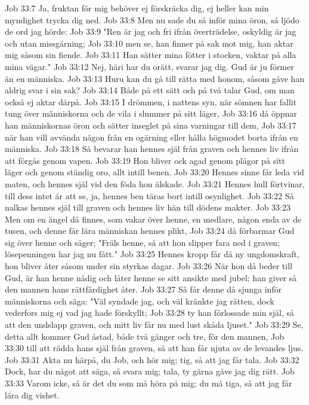 Job 33:7  Ja, fruktan för mig behöver ej förskräcka dig, ej heller kan min myndighet trycka dig ned.
Job 33:8  Men nu sade du så inför mina öron, så ljödo de ord jag hörde:
Job 33:9  "Ren är jag och fri ifrån överträdelse, oskyldig är jag och utan missgärning;
Job 33:10  men se, han finner på sak mot mig, han aktar mig såsom sin fiende.
Job 33:11  Han sätter mina fötter i stocken, vaktar på alla mina vägar."
Job 33:12  Nej, häri har du orätt, svarar jag dig. Gud är ju förmer än en människa.
Job 33:13  Huru kan du gå till rätta med honom, såsom gåve han aldrig svar i sin sak?
Job 33:14  Både på ett sätt och på två talar Gud, om man också ej aktar därpå.
Job 33:15  I drömmen, i nattens syn, när sömnen har fallit tung över människorna och de vila i slummer på sitt läger,
Job 33:16  då öppnar han människornas öron och sätter inseglet på sina varningar till dem,
Job 33:17  när han vill avvända någon från en ogärning eller hålla högmodet borta ifrån en människa.
Job 33:18  Så bevarar han hennes själ från graven och hennes liv ifrån att förgås genom vapen.
Job 33:19  Hon bliver ock agad genom plågor på sitt läger och genom ständig oro, allt intill benen.
Job 33:20  Hennes sinne får leda vid maten, och hennes själ vid den föda hon älskade.
Job 33:21  Hennes hull förtvinar, till dess intet är att se, ja, hennes ben täras bort intill osynlighet.
Job 33:22  Så nalkas hennes själ till graven och hennes liv hän till dödens makter.
Job 33:23  Men om en ängel då finnes, som vakar över henne, en medlare, någon enda av de tusen, och denne får lära människan hennes plikt,
Job 33:24  då förbarmar Gud sig över henne och säger; "Fräls henne, så att hon slipper fara ned i graven; lösepenningen har jag nu fått."
Job 33:25  Hennes kropp får då ny ungdomskraft, hon bliver åter såsom under sin styrkas dagar.
Job 33:26  När hon då beder till Gud, är han henne nådig och låter henne se sitt ansikte med jubel; han giver så den mannen hans rättfärdighet åter.
Job 33:27  Så får denne då sjunga inför människorna och säga: "Väl syndade jag, och väl kränkte jag rätten, dock vederfors mig ej vad jag hade förskyllt;
Job 33:28  ty han förlossade min själ, så att den undslapp graven, och mitt liv får nu med lust skåda ljuset."
Job 33:29  Se, detta allt kommer Gud åstad, både två gånger och tre, för den mannen,
Job 33:30  till att rädda hans själ från graven, så att han får njuta av de levandes ljus.
Job 33:31  Akta nu härpå, du Job, och hör mig; tig, så att jag får tala.
Job 33:32  Dock, har du något att säga, så svara mig; tala, ty gärna gåve jag dig rätt.
Job 33:33  Varom icke, så är det du som må höra på mig; du må tiga, så att jag får lära dig vishet.
